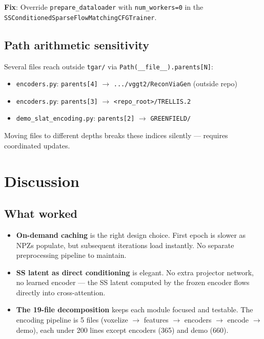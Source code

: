 \textbf{Fix}: Override \texttt{prepare\_dataloader} with \texttt{num\_workers=0} in the
\texttt{SSConditionedSparseFlowMatchingCFGTrainer}.

\subsection{Path arithmetic sensitivity}

Several files reach outside \texttt{tgar/} via \texttt{Path(\_\_file\_\_).parents[N]}:
\begin{itemize}
  \item \texttt{encoders.py}: \texttt{parents[4]} $\rightarrow$ \texttt{.../vggt2/ReconViaGen} (outside repo)
  \item \texttt{encoders.py}: \texttt{parents[3]} $\rightarrow$ \texttt{<repo\_root>/TRELLIS.2}
  \item \texttt{demo\_slat\_encoding.py}: \texttt{parents[2]} $\rightarrow$ \texttt{GREENFIELD/}
\end{itemize}

Moving files to different depths breaks these indices silently --- requires
coordinated updates.

\section{Discussion}

\subsection{What worked}

\begin{itemize}
  \item \textbf{On-demand caching} is the right design choice. First epoch is slower
  as NPZs populate, but subsequent iterations load instantly. No separate
  preprocessing pipeline to maintain.
  \item \textbf{SS latent as direct conditioning} is elegant. No extra projector
  network, no learned encoder --- the SS latent computed by the frozen
  encoder flows directly into cross-attention.
  \item \textbf{The 19-file decomposition} keeps each module focused and testable.
  The encoding pipeline is 5 files (voxelize $\rightarrow$ features $\rightarrow$ encoders $\rightarrow$
  encode $\rightarrow$ demo), each under 200 lines except encoders (365) and demo (660).
\end{itemize}

